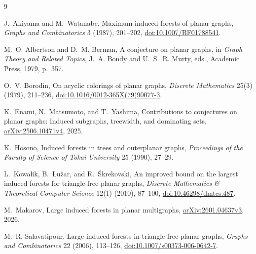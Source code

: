 \documentclass[11pt]{article}
\theoremstyle{definition}
\theoremstyle{remark}
\begin{document}
\begin{thebibliography}{9}
\footnotesize
\setlength{\itemsep}{0.15em}

J.~Akiyama and M.~Watanabe,
\newblock Maximum induced forests of planar graphs,
\newblock \emph{Graphs and Combinatorics} 3 (1987), 201--202,
\newblock \href{https://doi.org/10.1007/BF01788541}
{doi:10.1007/BF01788541}.

M.~O. Albertson and D.~M. Berman,
\newblock A conjecture on planar graphs,
\newblock in \emph{Graph Theory and Related Topics}, J.~A. Bondy and
U.~S.~R. Murty, eds., Academic Press, 1979, p.~357.

O.~V. Borodin,
\newblock On acyclic colorings of planar graphs,
\newblock \emph{Discrete Mathematics} 25(3) (1979), 211--236,
\newblock \href{https://doi.org/10.1016/0012-365X(79)90077-3}
{doi:10.1016/0012-365X(79)90077-3}.

K.~Enami, N.~Matsumoto, and T.~Yashima,
\newblock Contributions to conjectures on planar graphs: Induced subgraphs,
treewidth, and dominating sets,
\newblock \href{https://arxiv.org/abs/2506.10471}
{arXiv:2506.10471v4}, 2025.

K.~Hosono,
\newblock Induced forests in trees and outerplanar graphs,
\newblock \emph{Proceedings of the Faculty of Science of Tokai University}
25 (1990), 27--29.

L.~Kowalik, B.~Lu\v{z}ar, and R.~\v{S}krekovski,
\newblock An improved bound on the largest induced forests for triangle-free planar graphs,
\newblock \emph{Discrete Mathematics \& Theoretical Computer Science}
12(1) (2010), 87--100,
\newblock \href{https://doi.org/10.46298/dmtcs.487}
{doi:10.46298/dmtcs.487}.

M.~Makarov,
\newblock Large induced forests in planar multigraphs,
\newblock \href{https://arxiv.org/abs/2601.04637}
{arXiv:2601.04637v3}, 2026.

M.~R. Salavatipour,
\newblock Large induced forests in triangle-free planar graphs,
\newblock \emph{Graphs and Combinatorics} 22 (2006), 113--126,
\newblock \href{https://doi.org/10.1007/s00373-006-0642-7}
{doi:10.1007/s00373-006-0642-7}.

\end{thebibliography}
\end{document}
